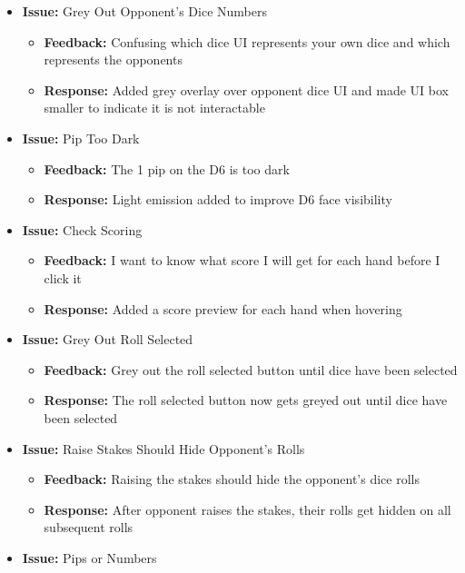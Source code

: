 \documentclass{article}
\begin{document}
\begin{itemize}
    \item \textbf{Issue:} Grey Out Opponent's Dice Numbers
    \begin{itemize}
        \item \textbf{Feedback:} Confusing which dice UI represents your own dice and which represents the opponents
        \item \textbf{Response:} Added grey overlay over opponent dice UI and made UI box smaller to indicate it is not interactable
    \end{itemize}
    \item \textbf{Issue:} Pip Too Dark
    \begin{itemize}
        \item \textbf{Feedback:} The 1 pip on the D6 is too dark
        \item \textbf{Response:} Light emission added to improve D6 face visibility
    \end{itemize}
    \item \textbf{Issue:} Check Scoring
    \begin{itemize}
        \item \textbf{Feedback:} I want to know what score I will get for each hand before I click it
        \item \textbf{Response:} Added a score preview for each hand when hovering
    \end{itemize}
    \item \textbf{Issue:} Grey Out Roll Selected
    \begin{itemize}
        \item \textbf{Feedback:} Grey out the roll selected button until dice have been selected
        \item \textbf{Response:} The roll selected button now gets greyed out until dice have been selected
    \end{itemize}
    \item \textbf{Issue:} Raise Stakes Should Hide Opponent's Rolls
    \begin{itemize}
        \item \textbf{Feedback:} Raising the stakes should hide the opponent's dice rolls
        \item \textbf{Response:} After opponent raises the stakes, their rolls get hidden on all subsequent rolls
    \end{itemize}
    \item \textbf{Issue:} Pips or Numbers
    \begin{itemize}

\end{itemize}
\end{itemize}
\end{document}
